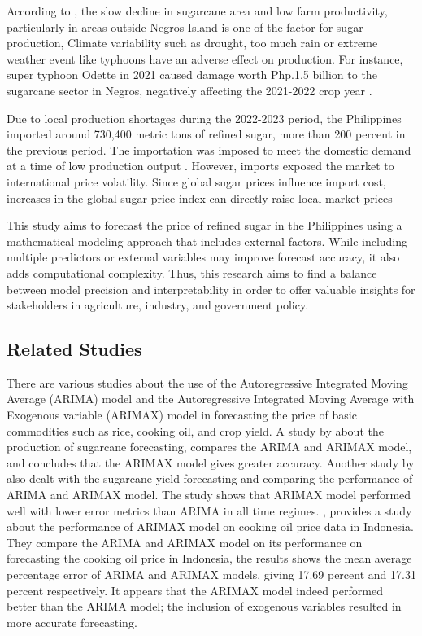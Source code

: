 \documentclass[11pt]{article}
\begin{document}
\indent According to \citet{sevilla-2021}, the slow decline in sugarcane area and low farm productivity, particularly in areas outside Negros Island is one of the factor for sugar production, Climate variability such as drought, too much rain or extreme weather event like typhoons have an adverse effect on production. For instance, super typhoon Odette in 2021 caused damage worth Php.1.5 billion to the sugarcane sector in Negros, negatively affecting the 2021-2022 crop year \citep{talavera-2022}. 

\indent Due to local production shortages during the 2022-2023 period, the Philippines imported around 730,400 metric tons of refined sugar, more than 200 percent in the previous period. The importation was imposed to meet the domestic demand at a time of low production output \citep{balita-2024B}. However, imports exposed the market to international price volatility. Since global sugar prices influence import cost, increases in the global sugar price index can directly raise local market prices \citep{vesper-2024}

\indent This study aims to forecast the price of refined sugar in the Philippines using a mathematical modeling approach that includes external factors. While including multiple predictors or external variables may improve forecast accuracy, it also adds computational complexity. Thus, this research aims to find a balance between model precision and interpretability in order to offer valuable insights for stakeholders in agriculture, industry, and government policy. 

\subsection{Related Studies}

\indent There are various studies about the use of the Autoregressive Integrated Moving Average (ARIMA) model and the Autoregressive Integrated Moving Average with Exogenous variable (ARIMAX) model in forecasting the price of basic commodities such as rice, cooking oil, and crop yield. A study by \citet{gopinath-2019} about the production of sugarcane forecasting, compares the ARIMA and ARIMAX model, and concludes that the ARIMAX model gives greater accuracy. Another study by \citet{pushpa} also dealt with the sugarcane yield forecasting and comparing the performance of ARIMA and ARIMAX model. The study shows that ARIMAX model performed well with lower error metrics than ARIMA in all time regimes. \citet{CookingOil}, provides a study about the performance of ARIMAX model on cooking oil price data in Indonesia. They compare the ARIMA and ARIMAX model  on its performance on forecasting the cooking oil price in Indonesia, the results shows the mean average percentage error of ARIMA and ARIMAX models, giving 17.69 percent and 17.31 percent respectively.  It appears that the ARIMAX model indeed performed better than the ARIMA model; the inclusion of exogenous variables resulted in more accurate forecasting. 
\end{document}

